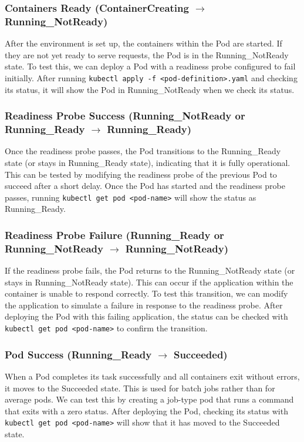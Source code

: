 \documentclass[main.tex]{subfiles}
\begin{document}
\subsubsection{Containers Ready (ContainerCreating $\rightarrow$ Running\_NotReady)}
After the environment is set up, the containers within the Pod are started. If they are not yet ready to serve requests, the Pod is in the Running\_NotReady state. To test this, we can deploy a Pod with a readiness probe configured to fail initially. After running \texttt{kubectl apply -f <pod-definition>.yaml} and checking its status, it will show the Pod in Running\_NotReady when we check its status.

\subsubsection{Readiness Probe Success (Running\_NotReady or Running\_Ready $\rightarrow$ Running\_Ready)}
Once the readiness probe passes, the Pod transitions to the Running\_Ready state (or stays in Running\_Ready state), indicating that it is fully operational. This can be tested by modifying the readiness probe of the previous Pod to succeed after a short delay. Once the Pod has started and the readiness probe passes, running \texttt{kubectl get pod <pod-name>} will show the status as Running\_Ready.

\subsubsection{Readiness Probe Failure (Running\_Ready or Running\_NotReady $\rightarrow$ Running\_NotReady)}
If the readiness probe fails, the Pod returns to the Running\_NotReady state (or stays in Running\_NotReady state). This can occur if the application within the container is unable to respond correctly. To test this transition, we can modify the application to simulate a failure in response to the readiness probe. After deploying the Pod with this failing application, the status can be checked with \texttt{kubectl get pod <pod-name>} to confirm the transition.

\subsubsection{Pod Success (Running\_Ready $\rightarrow$ Succeeded)}
When a Pod completes its task successfully and all containers exit without errors, it moves to the Succeeded state. This is used for batch jobs rather than for average pods. We can test this by creating a job-type pod that runs a command that exits with a zero status. After deploying the Pod, checking its status with \texttt{kubectl get pod <pod-name>} will show that it has moved to the Succeeded state.
\end{document}
